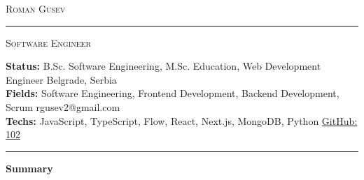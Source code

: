 \documentclass[10pt,A4]{article}
\newcommand{\cvsection}[1]
{
	\begin{center}
		\large\textcolor{sectcol}{\textbf{#1}}
	\end{center}
}
\newcommand{\metasection}[2]
{
    \footnotesize{#2} \hspace*{\fill} \footnotesize{#1}\\[1pt]
}
\begin{document}
\pagestyle{fancy}	








\vspace{-8pt}
\begin{center}
	\huge \textsc{Roman Gusev} \textcolor{sectcol}{\rule[-1mm]{1mm}{0.75cm}} \textsc{Software Engineer}\\[2pt]
\end{center}

\vspace{6pt}

\metasection{Belgrade, Serbia}{\textbf{Status:} B.Sc. Software Engineering, M.Sc. Education, Web Development Engineer}
\metasection{rgusev2@gmail.com}{\textbf{Fields:} Software Engineering, Frontend Development, Backend Development, Scrum} 
\metasection{\href{https://github.com/102}{GitHub: 102}}{\textbf{Techs:} JavaScript, TypeScript, Flow, React, Next.js, MongoDB, Python}
\vspace{-2pt}
\textcolor{softcol}{\hrule}
\vspace{6pt}

\normalsize

\vspace{-6pt}
\cvsection{Summary}
\vspace{-6pt}
\end{document}
